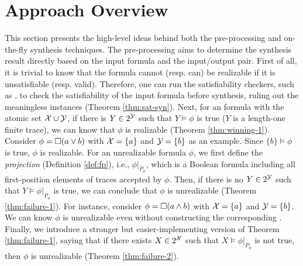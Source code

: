 \section{Approach Overview}
This section presents the high-level ideas behind both the pre-processing and on-the-fly synthesis techniques. The pre-processing aims to determine the synthesis result directly based on the input formula and the input/output pair. First of all, it is trivial to know that the formula cannot (resp. can) be realizable if it is unsatisfiable (resp. valid). Therefore, one can run the satisfiability checkers, such as \aaltaf\citep{LRPZV19}, to check the satisfiability of the input formula before synthesis, ruling out the meaningless instances (Theorem \ref{thm:sat-syn}). Next, for an \ltlf formula with the atomic set $\mathcal{X}\cup\mathcal{Y}$, if there is $Y\in 2^{\mathcal{Y}}$ such that $Y\models\phi$ is true ($Y$ is a length-one finite trace), we can know that $\phi$ is realizable (Theorem \ref{thm:winning-1}). Consider $\phi = \Box (a\vee b)$ with $\mathcal{X}=\{a\}$ and $\mathcal{Y}=\{b\}$ as an example. Since $\{b\}\models\phi$ is true, $\phi$ is realizable. 
For an unrealizable formula $\phi$, we first define the \emph{projection} (Definition \ref{def:fp}), i.e., $\phi|_{P_{\phi}}$, which is a Boolean formula including all first-position elements of traces accepted by $\phi$. Then, if there is no $Y\in 2^{\mathcal{Y}}$ such that $Y\models\phi|_{P_{\phi}}$ is true, we can conclude that $\phi$ is unrealizable (Theorem \ref{thm:failure-1}). For instance, consider $\phi = \Box (a\wedge b)$ with $\mathcal{X}=\{a\}$ and $\mathcal{Y}=\{b\}$. We can know $\phi$ is unrealizable even without constructing the corresponding \dfa. Finally, we introduce a stronger but easier-implementing version of Theorem \ref{thm:failure-1}, saying that if there exists $X\in 2^{\mathcal{X}}$ such that $X\models\phi|_{P_{\phi}}$ is not true, then $\phi$ is unrealizable (Theorem \ref{thm:failure-2}).  

